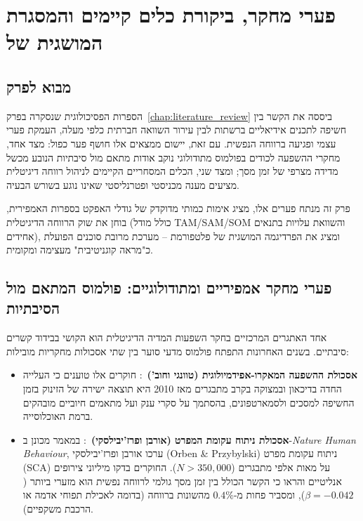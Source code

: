 \chapter{פערי מחקר, ביקורת כלים קיימים והמסגרת המושגית של \projectname{}}
\label{chap:gaps_and_system}

\section{מבוא לפרק}
הספרות הפסיכולוגית שנסקרה בפרק~\ref{chap:literature_review} ביססה את הקשר בין חשיפה לתכנים אידיאליים ברשתות לבין עירור השוואה חברתית כלפי מעלה, העמקת פערי עצמי ופגיעה ברווחה הנפשית. עם זאת, יישום ממצאים אלו חושף פער כפול: מצד אחד, מחקרי ההשפעה לכודים בפולמוס מתודולוגי נוקב אודות מתאם מול סיבתיות הנובע מכשל מדידה מצרפי של זמן מסך; ומצד שני, הכלים המסחריים הקיימים לניהול רווחה דיגיטלית מציעים מענה מכניסטי ופטרנליסטי שאינו נוגע בשורש הבעיה.

פרק זה מנתח פערים אלו, מציג אימות כמותי מדוקדק של גודלי האפקט בספרות האמפירית, בוחן את שוק הרווחה הדיגיטלית (כולל מודל \textenglish{TAM/SAM/SOM} והשוואת עלויות בתנאים אחידים), ומציג את הפרדיגמה המושגית של פלטפורמת \projectname{} -- מערכת מרובת סוכנים הפועלת כ"מראה קוגניטיבית" מעצימה ומקומית.

\section{פערי מחקר אמפיריים ומתודולוגיים: פולמוס המתאם מול הסיבתיות}
\label{sec:gaps_correlation_causation}
אחד האתגרים המרכזיים בחקר השפעות המדיה הדיגיטלית הוא הקושי בבידוד קשרים סיבתיים. בשנים האחרונות התפתח פולמוס מדעי סוער בין שתי אסכולות מחקריות מובילות:
\begin{itemize}
    \item \textbf{אסכולת ההשפעה המאקרו-אפידמיולוגית (טוונגי וחוב')}~\cite{twenge2018increases}: חוקרים אלו טוענים כי העלייה החדה בדיכאון ובמצוקה בקרב מתבגרים מאז 2010 היא תוצאה ישירה של הזינוק בזמן החשיפה למסכים ולסמארטפונים, בהסתמך על סקרי ענק ועל מתאמים חיוביים מובהקים ברמת האוכלוסייה.
    \item \textbf{אסכולת ניתוח עקומת המפרט (אורבן ופרז'יבילסקי)}~\cite{orben2019association}: במאמר מכונן ב-\textenglish{\textit{Nature Human Behaviour}}, ערכו אורבן ופרז'יבילסקי (\textenglish{Orben \& Przybylski}) ניתוח עקומת מפרט (\textenglish{SCA}) על מאות אלפי מתבגרים ($N > 350{,}000$). החוקרים בדקו מיליוני צירופים אנליטיים והראו כי הקשר הכולל בין זמן מסך גולמי לרווחה נפשית הוא מזערי ביותר ($\beta = -0.042$), ומסביר פחות מ-$0.4\%$ מהשונות ברווחה (בדומה לאכילת תפוחי אדמה או הרכבת משקפיים).
\end{itemize}

